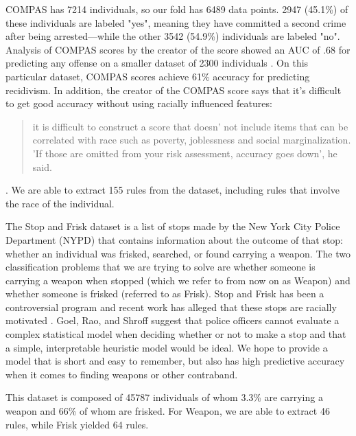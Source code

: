 COMPAS has 7214 individuals, so our fold has 6489 data points.
2947 (45.1\%) of these individuals are labeled "yes", meaning they have committed a second crime after being arrested---while the other 3542 (54.9\%) individuals are labeled "no".
Analysis of COMPAS scores by the creator of the score showed an AUC of .68 for predicting any offense on a smaller dataset of 2300 individuals \cite{BrennanDiEh09}.
On this particular dataset, COMPAS scores achieve 61\% accuracy for predicting recidivism. 
In addition, the creator of the COMPAS score says that it's difficult to get good accuracy without using racially influenced features:
\begin{quote}
it is difficult to construct a score that doesn' not include items that can be correlated with race such as poverty, joblessness and social marginalization. 'If those are omitted from your risk assessment, accuracy goes down', he said.
\end{quote}\cite{LarsonMaKiAn16}.
\noindent We are able to extract 155 rules from the dataset, including rules that involve the race of the individual.

The Stop and Frisk dataset is a list of stops made by the New York City Police Department (NYPD) that contains information about the outcome of that stop: whether an individual was frisked, searched, or found carrying a weapon.
The two classification problems that we are trying to solve are whether someone is carrying a weapon when stopped (which we refer to from now on as Weapon) and whether someone is frisked (referred to as Frisk).
Stop and Frisk has been a controversial program and recent work has alleged that these stops are racially motivated \cite{GoelRaSh16}.
Goel, Rao, and Shroff suggest that police officers cannot evaluate a complex statistical model when deciding whether or not to make a stop and that a simple, interpretable heuristic model would be ideal.
We hope to provide a model that is short and easy to remember, but also has high predictive accuracy when it comes to finding weapons or other contraband.

This dataset is composed of 45787 individuals of whom 3.3\% are carrying a weapon and 66\% of whom are frisked.
For Weapon, we are able to extract 46 rules, while Frisk yielded 64 rules.

